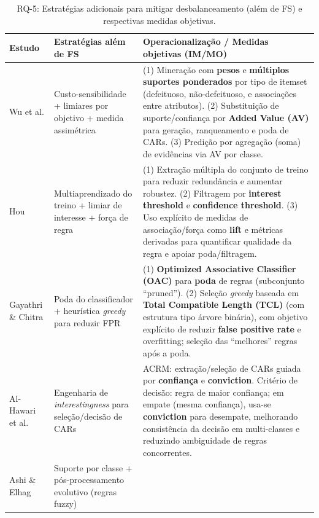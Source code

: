 \begin{table}[H]
\centering
\footnotesize
\setlength{\tabcolsep}{4pt}
\renewcommand{\arraystretch}{1.15}
\caption{RQ-5: Estratégias adicionais para mitigar desbalanceamento (além de FS) e respectivas medidas objetivas.}
\label{tab:rq5}
\begin{tabularx}{\textwidth}{|p{3.2cm}|p{3.6cm}|>{\raggedright\arraybackslash}X|}
\hline
\textbf{Estudo} & \textbf{Estratégias além de FS} & \textbf{Operacionalização / Medidas objetivas (IM/MO)} \\
\hline
Wu et al. \cite{wu2024novel} &
Custo-sensibilidade + limiares por objetivo + medida assimétrica &
(1) Mineração com \textbf{pesos} e \textbf{múltiplos suportes ponderados} por tipo de itemset (defeituoso, não-defeituoso, e associações entre atributos). (2) Substituição de suporte/confiança por \textbf{Added Value (AV)} para geração, ranqueamento e poda de CARs. (3) Predição por agregação (soma) de evidências via AV por classe. \\
\hline
Hou \cite{hou2025improved} &
Multiaprendizado do treino + limiar de interesse + força de regra &
(1) Extração múltipla do conjunto de treino para reduzir redundância e aumentar robustez. (2) Filtragem por \textbf{interest threshold} e \textbf{confidence threshold}. (3) Uso explícito de medidas de associação/força como \textbf{lift} e métricas derivadas para quantificar qualidade da regra e apoiar poda/filtragem. \\
\hline
Gayathri \& Chitra \cite{gayathri2015efficient} &
Poda do classificador + heurística \textit{greedy} para reduzir FPR &
(1) \textbf{Optimized Associative Classifier (OAC)} para \textbf{poda} de regras (subconjunto “pruned”). (2) Seleção \textit{greedy} baseada em \textbf{Total Compatible Length (TCL)} (com estrutura tipo árvore binária), com objetivo explícito de reduzir \textbf{false positive rate} e overfitting; seleção das “melhores” regras após a poda. \\
\hline
Al-Hawari et al. \cite{alhawari2021classification} &
Engenharia de \textit{interestingness} para seleção/decisão de CARs &
ACRM: extração/seleção de CARs guiada por \textbf{confiança} e \textbf{conviction}. Critério de decisão: regra de maior confiança; em empate (mesma confiança), usa-se \textbf{conviction} para desempate, melhorando consistência da decisão em multi-classes e reduzindo ambiguidade de regras concorrentes. \\
\hline
Ashi \& Elhag \cite{ashi2021enhancing} &
Suporte por classe + pós-processamento evolutivo (regras fuzzy) &

\end{tabularx}
\end{table}
